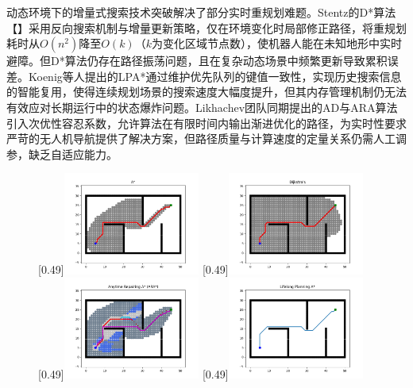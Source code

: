 \documentclass[master,academic]{ysuthesis} %
\begin{document}
		动态环境下的增量式搜索技术突破解决了部分实时重规划难题。Stentz的D*算法【】采用反向搜索机制与增量更新策略，仅在环境变化时局部修正路径，将重规划耗时从$O(n^2)$降至$O(k)$（$k$为变化区域节点数），使机器人能在未知地形中实时避障。但D*算法仍存在路径振荡问题，且在复杂动态场景中频繁更新导致累积误差。Koenig等人提出的LPA*通过维护优先队列的键值一致性，实现历史搜索信息的智能复用，使得连续规划场景的搜索速度大幅度提升，但其内存管理机制仍无法有效应对长期运行中的状态爆炸问题。Likhachev团队同期提出的AD与ARA算法引入次优性容忍系数，允许算法在有限时间内输出渐进优化的路径，为实时性要求严苛的无人机导航提供了解决方案，但路径质量与计算速度的定量关系仍需人工调参，缺乏自适应能力。
		\begin{figure}[!ht]
			\centering
			[0.49\textwidth]{\includegraphics[width=0.4\textwidth]{插图/A-search/Astar.png}}
			[0.49\textwidth]{\includegraphics[width=0.4\textwidth]{插图/A-search/Dijstra.png}}
			[0.49\textwidth]{\includegraphics[width=0.4\textwidth]{插图/A-search/ARAstar.png}}
			[0.49\textwidth]{\includegraphics[width=0.4\textwidth]{插图/A-search/LPAstar.png}}

\end{figure}
\end{document}
